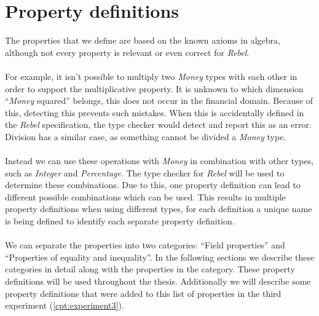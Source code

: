 \section{Property definitions}
\label{sct:properties_property_definitions}
The properties that we define are based on the known axioms in algebra, although
not every property is relevant or even correct for \textit{Rebel}.\\
\\
For example, it isn't possible to multiply two
\textit{Money} types with each other in order to support the multiplicative
property. It is unknown to which dimension ``\textit{Money} squared'' belongs,
this does not occur in the financial domain. Because of this, detecting this
prevents such mistakes. When this is accidentally defined in the \textit{Rebel}
specification, the type checker would detect and report this as an error.
Division has a similar case, as something cannot be divided a \textit{Money}
type.\\
\\
Instead we can use these operations with \textit{Money} in combination with
other types, such as \textit{Integer} and \textit{Percentage}. The type checker
for \textit{Rebel} will be used to determine these combinations. Due to this,
one property definition can lead to different possible combinations which can be
used. This results in multiple property definitions when using different types,
for each definition a unique name is being defined to identify each separate
property definition.\\
\\
We can separate the properties into two categories: ``Field properties'' and
``Properties of equality and inequality''. In the following sections we describe
these categories in detail along with the properties in the category. These
property definitions will be used throughout the thesis. Additionally we will
describe some property definitions that were added to this list of properties in
the third experiment (\autoref{cpt:experiment3}).

